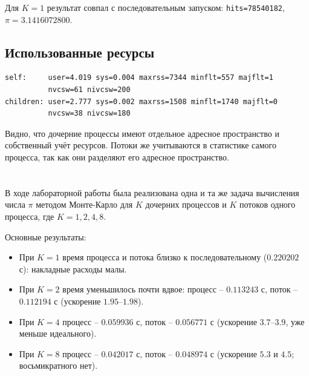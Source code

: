 Для \(K=1\) результат совпал с последовательным запуском:
\texttt{hits=78540182}, \(\pi = 3.1416072800\).

\subsection*{Использованные ресурсы}

\begin{verbatim}
self:     user=4.019 sys=0.004 maxrss=7344 minflt=557 majflt=1
          nvcsw=61 nivcsw=200
children: user=2.777 sys=0.002 maxrss=1508 minflt=1740 majflt=0
          nvcsw=38 nivcsw=180
\end{verbatim}

Видно, что дочерние процессы имеют отдельное адресное пространство и собственный
учёт ресурсов. Потоки же учитываются в статистике самого процесса, так как они
разделяют его адресное пространство.

\newpage
{}
\section*{}
В ходе лабораторной работы была реализована одна и та же задача вычисления числа
\(\pi\) методом Монте-Карло для \(K\) дочерних процессов и \(K\) потоков одного
процесса, где \(K = 1, 2, 4, 8\).

Основные результаты:
\begin{itemize}
    \item При \(K=1\) время процесса и потока близко к последовательному
          (\(0.220202\) с): накладные расходы малы.
    \item При \(K=2\) время уменьшилось почти вдвое: процесс -- \(0.113243\) с,
          поток -- \(0.112194\) с (ускорение \(1.95\)--\(1.98\)).
    \item При \(K=4\) процесс -- \(0.059936\) с, поток -- \(0.056771\) с
          (ускорение \(3.7\)--\(3.9\), уже меньше идеального).
    \item При \(K=8\) процесс -- \(0.042017\) с, поток -- \(0.048974\) с
          (ускорение \(5.3\) и \(4.5\); восьмикратного нет).
\end{itemize}

